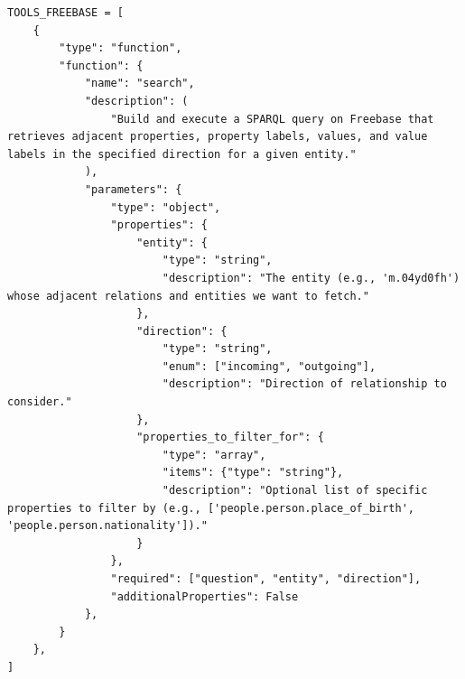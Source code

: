 \documentclass[sigconf]{acmart}
\begin{document}
\begin{lstlisting}[style=pythonstyle]
TOOLS_FREEBASE = [
    {
        "type": "function",
        "function": {
            "name": "search",
            "description": (
                "Build and execute a SPARQL query on Freebase that retrieves adjacent properties, property labels, values, and value labels in the specified direction for a given entity."
            ),
            "parameters": {
                "type": "object",
                "properties": {
                    "entity": {
                        "type": "string",
                        "description": "The entity (e.g., 'm.04yd0fh') whose adjacent relations and entities we want to fetch."
                    },
                    "direction": {
                        "type": "string",
                        "enum": ["incoming", "outgoing"],
                        "description": "Direction of relationship to consider."
                    },
                    "properties_to_filter_for": {
                        "type": "array",
                        "items": {"type": "string"},
                        "description": "Optional list of specific properties to filter by (e.g., ['people.person.place_of_birth', 'people.person.nationality'])."
                    }
                },
                "required": ["question", "entity", "direction"],
                "additionalProperties": False
            },
        }
    },
]
\end{lstlisting}

\end{document}
